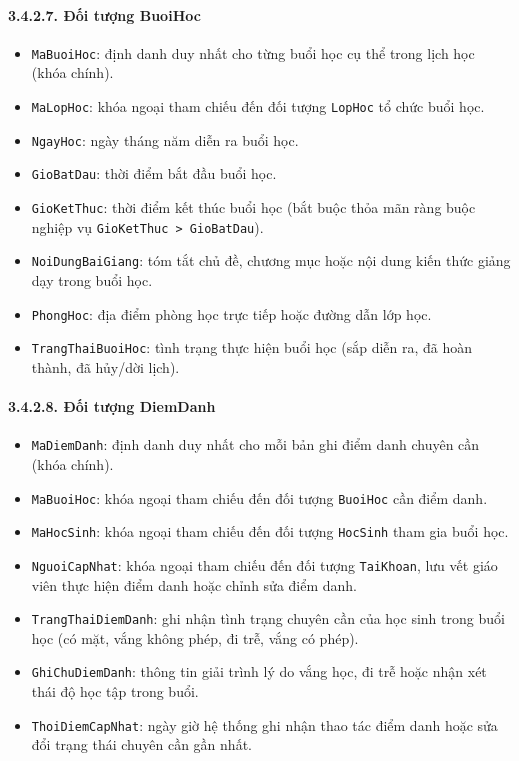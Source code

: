 \documentclass[12pt,a4paper]{article}
\begin{document}
\paragraph{3.4.2.7. Đối tượng BuoiHoc}\mbox{}
\begin{itemize}\setlength{\itemsep}{2pt}\setlength{\parskip}{0pt}
    \item \texttt{MaBuoiHoc}: định danh duy nhất cho từng buổi học cụ thể trong lịch học (khóa chính).
    \item \texttt{MaLopHoc}: khóa ngoại tham chiếu đến đối tượng \texttt{LopHoc} tổ chức buổi học.
    \item \texttt{NgayHoc}: ngày tháng năm diễn ra buổi học.
    \item \texttt{GioBatDau}: thời điểm bắt đầu buổi học.
    \item \texttt{GioKetThuc}: thời điểm kết thúc buổi học (bắt buộc thỏa mãn ràng buộc nghiệp vụ \texttt{GioKetThuc > GioBatDau}).
    \item \texttt{NoiDungBaiGiang}: tóm tắt chủ đề, chương mục hoặc nội dung kiến thức giảng dạy trong buổi học.
    \item \texttt{PhongHoc}: địa điểm phòng học trực tiếp hoặc đường dẫn lớp học.
    \item \texttt{TrangThaiBuoiHoc}: tình trạng thực hiện buổi học (sắp diễn ra, đã hoàn thành, đã hủy/dời lịch).
\end{itemize}

\paragraph{3.4.2.8. Đối tượng DiemDanh}\mbox{}
\begin{itemize}\setlength{\itemsep}{2pt}\setlength{\parskip}{0pt}
    \item \texttt{MaDiemDanh}: định danh duy nhất cho mỗi bản ghi điểm danh chuyên cần (khóa chính).
    \item \texttt{MaBuoiHoc}: khóa ngoại tham chiếu đến đối tượng \texttt{BuoiHoc} cần điểm danh.
    \item \texttt{MaHocSinh}: khóa ngoại tham chiếu đến đối tượng \texttt{HocSinh} tham gia buổi học.
    \item \texttt{NguoiCapNhat}: khóa ngoại tham chiếu đến đối tượng \texttt{TaiKhoan}, lưu vết giáo viên thực hiện điểm danh hoặc chỉnh sửa điểm danh.
    \item \texttt{TrangThaiDiemDanh}: ghi nhận tình trạng chuyên cần của học sinh trong buổi học (có mặt, vắng không phép, đi trễ, vắng có phép).
    \item \texttt{GhiChuDiemDanh}: thông tin giải trình lý do vắng học, đi trễ hoặc nhận xét thái độ học tập trong buổi.
    \item \texttt{ThoiDiemCapNhat}: ngày giờ hệ thống ghi nhận thao tác điểm danh hoặc sửa đổi trạng thái chuyên cần gần nhất.
\end{itemize}
\end{document}
